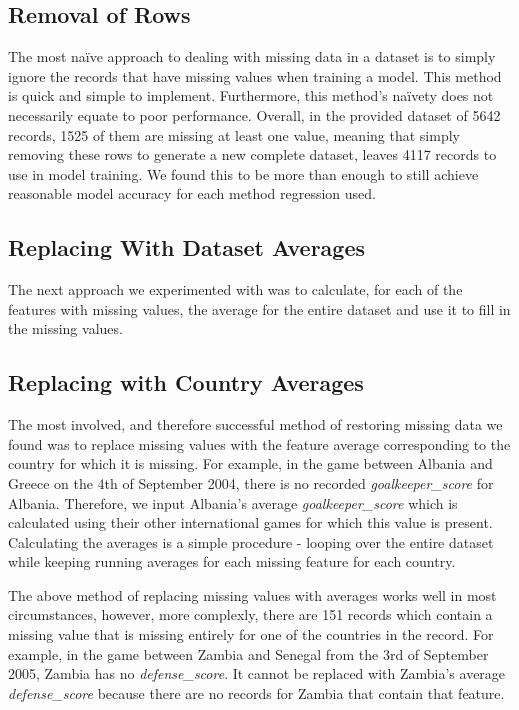 \subsection{Removal of Rows}
The most naïve approach to dealing with missing data in a dataset is to simply ignore the records that have missing values when training a model. This method is quick and simple to implement. Furthermore, this method's naïvety does not necessarily equate to poor performance. Overall, in the provided dataset of 5642 records, 1525 of them are missing at least one value, meaning that simply removing these rows to generate a new complete dataset, leaves 4117 records to use in model training. We found this to be more than enough to still achieve reasonable model accuracy for each method regression used.

\subsection{Replacing With Dataset Averages}
The next approach we experimented with was to calculate, for each of the features with missing values, the average for the entire dataset and use it to fill in the missing values. 

\subsection{Replacing with Country Averages}
The most involved, and therefore successful method of restoring missing data we found was to replace missing values with the feature average corresponding to the country for which it is missing. For example, in the game between Albania and Greece on the 4th of September 2004, there is no recorded \textit{goalkeeper\_score} for Albania. Therefore, we input Albania's average \textit{goalkeeper\_score} which is calculated using their other international games for which this value is present. Calculating the averages is a simple procedure - looping over the entire dataset while keeping running averages for each missing feature for each country. 

The above method of replacing missing values with averages works well in most circumstances, however, more complexly, there are 151 records which contain a missing value that is missing entirely for one of the countries in the record. For example, in the game between Zambia and Senegal from the 3rd of September 2005, Zambia has no \textit{defense\_score}. It cannot be replaced with Zambia's average \textit{defense\_score} because there are no records for Zambia that contain that feature. 

